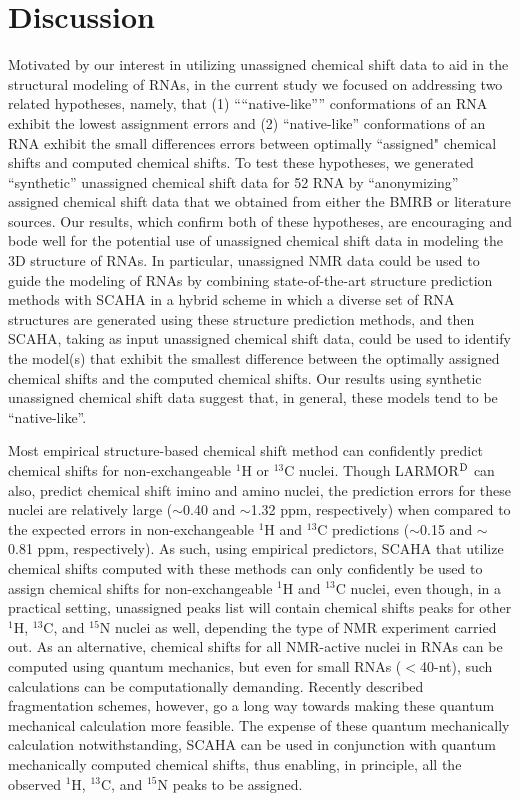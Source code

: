 \documentclass[journal=jcisd8,manuscript=article,layout=onecolumn]{achemso}
\begin{document}
\section{Discussion} 
Motivated by our interest in utilizing unassigned chemical shift data to aid in the structural modeling of RNAs, in the current study we focused on addressing two related hypotheses, namely, that (1) ````native-like''” conformations of an RNA exhibit the lowest assignment errors and (2)  ``native-like'' conformations of an RNA exhibit the small differences errors between optimally ``assigned" chemical shifts and computed chemical shifts. To test these hypotheses, we generated ``synthetic'' unassigned chemical shift data for 52 RNA by ``anonymizing'' assigned chemical shift data that we obtained from either the BMRB or literature sources. Our results, which confirm both of these hypotheses, are encouraging and bode well for the potential use of unassigned chemical shift data in modeling the 3D structure of RNAs. In  particular, unassigned NMR data could be used to guide the modeling of RNAs by combining state-of-the-art structure prediction methods with SCAHA in a hybrid scheme in which a diverse set of RNA structures are generated using these structure prediction methods, and then SCAHA, taking as input unassigned chemical shift data, could be used to identify the model(s) that exhibit the smallest difference between the optimally assigned chemical shifts and the computed chemical shifts. Our results using synthetic unassigned chemical shift data suggest that, in general, these models tend to be ``native-like''. 

Most empirical structure-based chemical shift method can confidently predict chemical shifts for non-exchangeable $^{1}$H or $^{13}$C nuclei\cite{dejaegere1999an, cromsigt2001prediction, frank2013prediction, frank2014simple}. Though LARMOR$^{\rm D}$ can also, predict chemical shift imino and amino nuclei, the prediction errors for these nuclei are relatively large ($\sim$0.40 and $\sim$1.32 ppm, respectively)\cite{frank2014simple} when compared to the expected errors in non-exchangeable $^{1}$H and $^{13}$C predictions ($\sim$0.15 and $\sim$0.81 ppm, respectively)\cite{frank2014simple}. As such, using empirical predictors, SCAHA that utilize chemical shifts computed with these methods can only confidently be used to assign chemical shifts for non-exchangeable $^{1}$H and $^{13}$C nuclei, even though, in a practical setting, unassigned peaks list will contain chemical shifts peaks for other $^{1}$H, $^{13}$C,  and $^{15}$N nuclei as well, depending the type of NMR experiment carried out. As an alternative, chemical shifts for all NMR-active nuclei in RNAs can be computed using quantum mechanics, but even for small RNAs ($<$40-nt), such calculations can be computationally demanding.  Recently described fragmentation schemes, however, go a long way towards making these quantum mechanical calculation more feasible\cite{swails2015afnmr}. The expense of these quantum mechanically calculation notwithstanding, SCAHA can be used in conjunction with quantum mechanically computed chemical shifts, thus enabling, in principle, all the observed  $^{1}$H, $^{13}$C,  and $^{15}$N peaks to be assigned.
\end{document}
